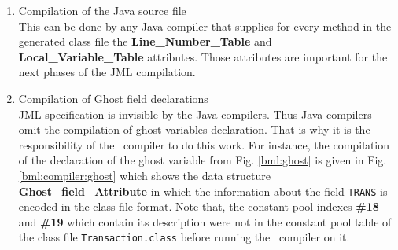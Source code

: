 \begin{enumerate}
\item Compilation of the Java source file \\
  This can be done by any Java compiler that supplies for every method in the generated class file 
  the \textbf{Line\_Number\_Table}
  and \textbf{Local\_Variable\_Table}  attributes. 
   Those attributes are important for the next phases of the JML compilation.

\item Compilation of Ghost field declarations \\
      JML specification is invisible by the 
      Java compilers. Thus Java compilers omit the compilation of ghost variables declaration.
      That is why it is the responsibility of the \JMLtoBML \  compiler to do this work. 
      For instance, the compilation of the declaration of the ghost variable from
      Fig. \ref{bml:ghost} is given in Fig.\ref{bml:compiler:ghost} which shows the data structure \textbf{Ghost\_field\_Attribute}
      in which the information about the field
      \texttt{TRANS} is encoded in the class file format. 
      Note that,  the constant pool indexes \textbf{\#18} and \textbf{\#19}  which contain its description were not in the constant
      pool table of the class file \texttt{Transaction.class} before running the \JMLtoBML \ compiler on it. 
\begin{figure}[ht!]
\end{figure}
\end{enumerate}
